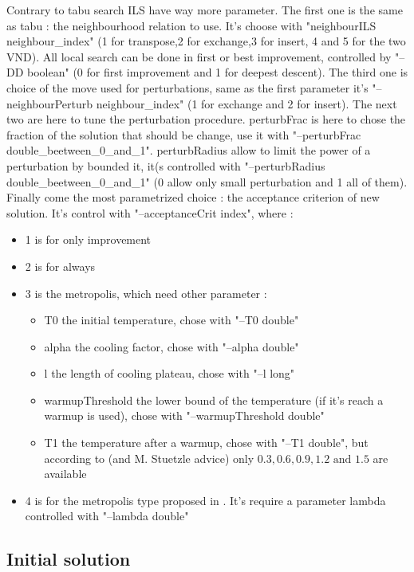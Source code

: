 \documentclass[12pt,a4paper]{article}
\begin{document}
Contrary to tabu search ILS have way more parameter. The first one is the same as tabu : the neighbourhood relation to use. It's choose with "neighbourILS neighbour\_index" (1 for transpose,2 for exchange,3 for insert, 4 and 5 for the two VND). All local search can be done in first or best improvement, controlled by "--DD boolean" (0 for first improvement and 1 for deepest descent). The third one is choice of the move used for perturbations, same as the first parameter it's "--neighbourPerturb neighbour\_index" (1 for exchange and 2 for insert). The next two are here to tune the perturbation procedure. perturbFrac is here to chose the fraction of the solution that should be change, use it with "--perturbFrac double\_beetween\_0\_and\_1". perturbRadius allow to limit the power of a perturbation by bounded it, it(s controlled with "--perturbRadius double\_beetween\_0\_and\_1" (0 allow only small perturbation and 1 all of them). Finally come the most parametrized choice : the acceptance criterion of new solution. It's control with "--acceptanceCrit index", where :
\begin{itemize}
\item
1 is for only improvement
\item
2 is for always
\item
3 is the metropolis, which need other parameter :
\begin{itemize}
\item
T0 the initial temperature, chose with "--T0 double"
\item
alpha the cooling factor, chose with "--alpha double"
\item
l the length of cooling plateau, chose with "--l long"
\item
warmupThreshold the lower bound of the temperature (if it's reach a warmup is used), chose with "--warmupThreshold double"
\item
T1 the temperature after a warmup, chose with "--T1 double", but according to \cite{Ruiz06asimple} (and M. Stuetzle advice) only $0.3, 0.6, 0.9, 1.2 \text{ and } 1.5$ are available
\end{itemize}
\item
4 is for the metropolis type proposed in \cite{Ruiz06asimple}. It's require a parameter lambda controlled with "--lambda double"
\end{itemize}

\subsection{Initial solution}
\end{document}
